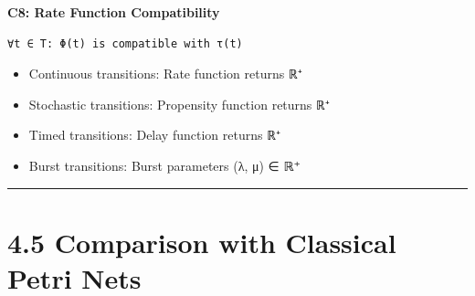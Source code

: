 \textbf{C8: Rate Function Compatibility}

\begin{lstlisting}
∀t ∈ T: Φ(t) is compatible with τ(t)
\end{lstlisting}

\begin{itemize}
\tightlist
\item
  Continuous transitions: Rate function returns ℝ⁺
\item
  Stochastic transitions: Propensity function returns ℝ⁺
\item
  Timed transitions: Delay function returns ℝ⁺
\item
  Burst transitions: Burst parameters (λ, μ) ∈ ℝ⁺
\end{itemize}

\begin{center}\rule{0.5\linewidth}{0.5pt}\end{center}

\hypertarget{comparison-with-classical-petri-nets}{%
\section{4.5 Comparison with Classical Petri
Nets}\label{comparison-with-classical-petri-nets}}


